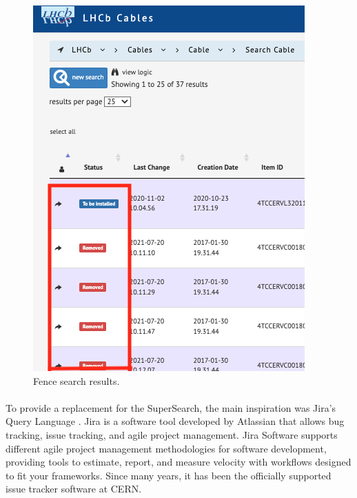 \begin{figure}[H]
\begin{minipage}[t]{.4\textwidth}
        \includegraphics[width=\linewidth]{figuras/fence_search_2_sm.png}
        \caption{Fence search results.}
        \label{fence-ss-2}
    \end{minipage}
\end{figure}

\paragraph{} To provide a replacement for the SuperSearch, the main inspiration was Jira's Query Language \cite{jirajql}. Jira is a software tool developed by Atlassian that allows bug tracking, issue tracking, and agile project management. Jira Software supports different agile project management methodologies for software development, providing tools to estimate, report, and measure velocity with workflows designed to fit your frameworks. Since many years, it has been the officially supported issue tracker software at CERN. \cite{jirajql}

